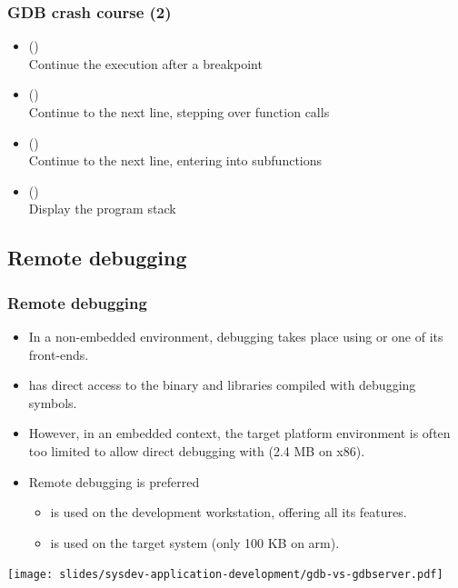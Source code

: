 \begin{frame}
  \frametitle{GDB crash course (2)}
  \small
  \begin{itemize}
  \item {} ()\\
    Continue the execution after a breakpoint
  \item {} ()\\
    Continue to the next line, stepping over function calls
  \item {} ()\\
    Continue to the next line, entering into subfunctions
  \item {} ()\\
    Display the program stack
  \end{itemize}
\end{frame}

\subsection{Remote debugging}

\begin{frame}
  \frametitle{Remote debugging}
  \begin{itemize}
  \item In a non-embedded environment, debugging takes place using 
    or one of its front-ends.
  \item {} has direct access to the binary and libraries compiled
    with debugging symbols.
  \item However, in an embedded context, the target platform
    environment is often too limited to allow direct debugging with
     (2.4 MB on x86).
  \item Remote debugging is preferred
    \begin{itemize}
    \item {} is used on the development workstation, offering
      all its features.
    \item {} is used on the target system (only 100 KB
      on arm).
    \end{itemize}
  \end{itemize}
  \begin{center}
    \texttt{[image: slides/sysdev-application-development/gdb-vs-gdbserver.pdf]}
  \end{center}
\end{frame}

